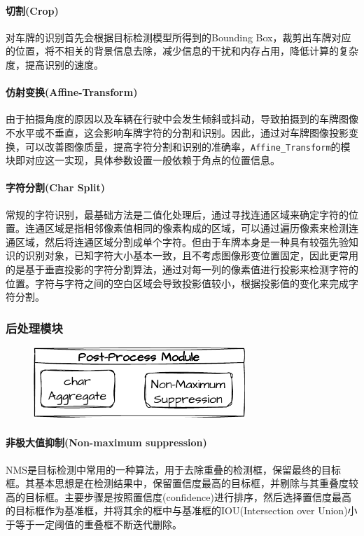 \documentclass[master]{shtthesis}
\begin{document}
\paragraph{切割(Crop)}
对车牌的识别首先会根据目标检测模型所得到的Bounding Box，裁剪出车牌对应的位置，将不相关的背景信息去除，减少信息的干扰和内存占用，降低计算的复杂度，提高识别的速度。

\paragraph{仿射变换(Affine-Transform)}
由于拍摄角度的原因以及车辆在行驶中会发生倾斜或抖动，导致拍摄到的车牌图像不水平或不垂直，这会影响车牌字符的分割和识别。因此，通过对车牌图像投影变换，可以改善图像质量，提高字符分割和识别的准确率，\verb*|Affine_Transform|的模块即对应这一实现，具体参数设置一般依赖于角点的位置信息。

\paragraph{字符分割(Char Split)}\label{字符分割}
常规的字符识别，最基础方法是二值化处理后，通过寻找连通区域来确定字符的位置。连通区域是指相邻像素值相同的像素构成的区域，可以通过遍历像素来检测连通区域，然后将连通区域分割成单个字符。但由于车牌本身是一种具有较强先验知识的识别对象，已知字符大小基本一致，且不考虑图像形变位置固定，因此更常用的是基于垂直投影的字符分割算法，通过对每一列的像素值进行投影来检测字符的位置。字符与字符之间的空白区域会导致投影值较小，根据投影值的变化来完成字符分割。


\subsubsection{后处理模块}
\begin{figure}[H]
	\centering
	\includegraphics[width=8cm]{img/m2.pdf}
	\label{后处理模块汇总}
\end{figure}
\paragraph{非极大值抑制(Non-maximum suppression)}
NMS是目标检测中常用的一种算法，用于去除重叠的检测框，保留最终的目标框。其基本思想是在检测结果中，保留置信度最高的目标框，并剔除与其重叠度较高的目标框。主要步骤是按照置信度(confidence)进行排序，然后选择置信度最高的目标框作为基准框，并将其余的框中与基准框的IOU(Intersection over Union)小于等于一定阈值的重叠框不断迭代删除。
\end{document}
